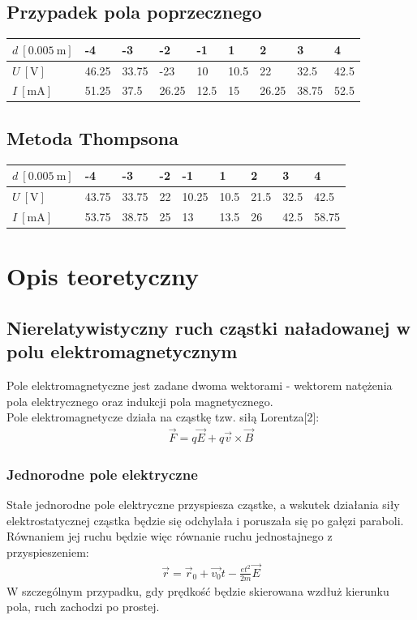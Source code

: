 \documentclass[paper=a4, fontsize=12pt]{scrartcl}
\begin{document}
\subsection{Przypadek pola poprzecznego	}
\begin{table}[h]
	\begin{tabular}{|l|l|l|l|l|l|l|l|l|}
		\hline
		$d\:[0.005\:\mathrm{m}]$ & -4    & -3    & -2    & -1   & 1    & 2     & 3     & 4    \\ \hline
		$U\:[\mathrm{V}]$ & 46.25 & 33.75 & -23   & 10   & 10.5 & 22    & 32.5  & 42.5 \\ \hline
		$I\:[\mathrm{mA}]$ & 51.25 & 37.5  & 26.25 & 12.5 & 15   & 26.25 & 38.75 & 52.5 \\ \hline
	\end{tabular}
\end{table}
\subsection{Metoda Thompsona}
\begin{table}[h]
	\begin{tabular}{|l|l|l|l|l|l|l|l|l|}
		\hline
		$d\:[0.005\:\mathrm{m}]$ & -4    & -3    & -2 & -1    & 1    & 2    & 3    & 4     \\ \hline
		$U\:[\mathrm{V}]$ & 43.75 & 33.75 & 22 & 10.25 & 10.5 & 21.5 & 32.5 & 42.5  \\ \hline
		$I\:[\mathrm{mA}]$ & 53.75 & 38.75 & 25 & 13    & 13.5 & 26   & 42.5 & 58.75 \\ \hline
	\end{tabular}
\end{table}
\section{Opis teoretyczny}
\subsection{Nierelatywistyczny ruch cząstki naładowanej w polu elektromagnetycznym}
Pole elektromagnetyczne jest zadane dwoma wektorami - wektorem natężenia pola elektrycznego  oraz indukcji pola magnetycznego.\\
Pole elektromagnetycze działa na cząstkę tzw. siłą Lorentza[2]:
\begin{align}
\vec{F}=q\vec{E}+q\vec{v}\times\vec{B}
\end{align}
\subsubsection{Jednorodne pole elektryczne}
Stałe jednorodne pole elektryczne przyspiesza cząstke, a wskutek działania siły elektrostatycznej cząstka będzie się odchylała i poruszała się po gałęzi paraboli. Równaniem jej ruchu będzie więc równanie ruchu jednostajnego z przyspieszeniem:
\begin{align}
\vec{r}=\vec{r}_0+\vec{v_0}t-\frac{et^2}{2m}\vec{E}
\end{align}
W szczególnym przypadku, gdy prędkość będzie skierowana wzdłuż kierunku pola, ruch zachodzi po prostej.
\end{document}
